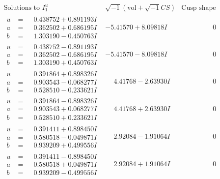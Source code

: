 \documentclass[1p]{elsarticle_modified}
\theoremstyle{definition}
\newcommand{\I}{\sqrt{-1}}
\begin{document}
$$\begin{array}{c|c|c}  
\text{Solutions to }I^u_{1}& \I (\text{vol} + \sqrt{-1}CS) & \text{Cusp shape}\\
 \hline 
\begin{aligned}
u &= \phantom{-}0.438752 + 0.891193 I \\
a &= \phantom{-}0.362502 + 0.686195 I \\
b &= \phantom{-}1.303190 - 0.450763 I\end{aligned}
 & -5.41570 + 8.09818 I & \phantom{-0.000000 } 0 \\ \hline\begin{aligned}
u &= \phantom{-}0.438752 - 0.891193 I \\
a &= \phantom{-}0.362502 - 0.686195 I \\
b &= \phantom{-}1.303190 + 0.450763 I\end{aligned}
 & -5.41570 - 8.09818 I & \phantom{-0.000000 } 0 \\ \hline\begin{aligned}
u &= \phantom{-}0.391864 + 0.898326 I \\
a &= \phantom{-}0.903543 - 0.068277 I \\
b &= \phantom{-}0.528510 - 0.233621 I\end{aligned}
 & \phantom{-}4.41768 - 2.63930 I & \phantom{-0.000000 } 0 \\ \hline\begin{aligned}
u &= \phantom{-}0.391864 - 0.898326 I \\
a &= \phantom{-}0.903543 + 0.068277 I \\
b &= \phantom{-}0.528510 + 0.233621 I\end{aligned}
 & \phantom{-}4.41768 + 2.63930 I & \phantom{-0.000000 } 0 \\ \hline\begin{aligned}
u &= \phantom{-}0.391411 + 0.898450 I \\
a &= \phantom{-}0.580518 - 0.049871 I \\
b &= \phantom{-}0.939209 + 0.499556 I\end{aligned}
 & \phantom{-}2.92084 - 1.91064 I & \phantom{-0.000000 } 0 \\ \hline\begin{aligned}
u &= \phantom{-}0.391411 - 0.898450 I \\
a &= \phantom{-}0.580518 + 0.049871 I \\
b &= \phantom{-}0.939209 - 0.499556 I\end{aligned}
 & \phantom{-}2.92084 + 1.91064 I & \phantom{-0.000000 } 0 \\ \hline\begin{aligned}

\end{aligned}
\end{array}$$
\end{document}
